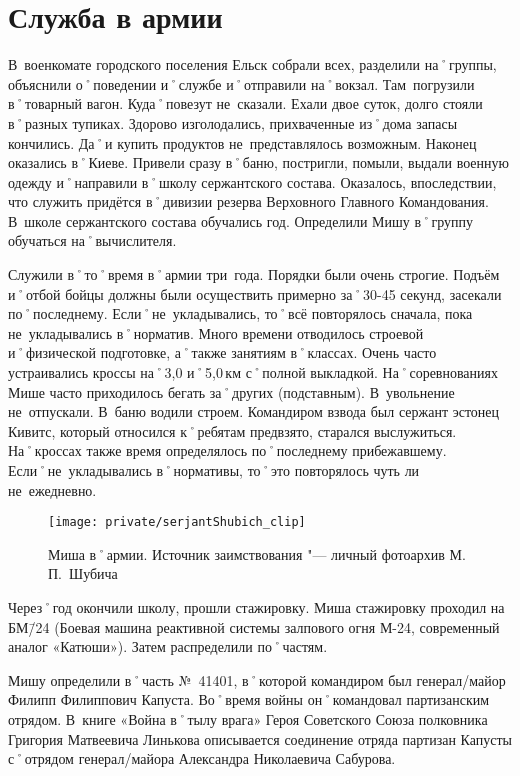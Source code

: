 ﻿\chapter{Служба в армии}
В~военкомате городского поселения Ельск собрали всех, разделили на˚группы, объяснили о˚поведении и˚службе и˚отправили на˚вокзал. Там~погрузили в˚товарный вагон. Куда˚повезут не~сказали. Ехали двое суток, долго стояли в˚разных тупиках. Здорово изголодались, прихваченные из˚дома запасы кончились. Да˚и купить продуктов не~представлялось возможным. Наконец оказались в˚Киеве. Привели сразу в˚баню, постригли, помыли, выдали военную одежду и˚направили в˚школу сержантского состава. Оказалось, впоследствии, что служить придётся в˚дивизии резерва Верховного Главного Командования. В~школе сержантского состава обучались год. Определили Мишу в˚группу обучаться на˚вычислителя.

Служили в˚то˚время в˚армии три~года. Порядки были очень строгие. Подъём и˚отбой бойцы должны были осуществить примерно за˚30-45 секунд, засекали по˚последнему. Если˚не~укладывались, то˚всё повторялось сначала, пока не~укладывались в˚норматив. Много времени отводилось строевой и˚физической подготовке, а˚также занятиям в˚классах. Очень часто устраивались кроссы на˚3,0 и˚5,0\,км с˚полной выкладкой. На˚соревнованиях Мише часто приходилось бегать за˚других (подставным). В~увольнение не~отпускали. В~баню водили строем. Командиром взвода был сержант эстонец Кивитс, который относился к˚ребятам предвзято, старался выслужиться. На˚кроссах также время определялось по˚последнему прибежавшему. Если˚не~укладывались в˚нормативы, то˚это повторялось чуть ли не~ежедневно.


\begin{figure}[H]
\texttt{[image: private/serjantShubich\_clip]}
\caption{Миша в˚армии. Источник заимствования "--- личный фотоархив М.\,П.~Шубича}
\label{fig:serjantShubich}
\end{figure}


Через˚год окончили школу, прошли стажировку. Миша стажировку проходил на БМ\=/24 (Боевая машина реактивной системы залпового огня М-24, современный аналог «Катюши»). Затем распределили по˚частям. 

Мишу определили в˚часть №~41401, в˚которой командиром был генерал\-/майор Филипп Филиппович Капуста. Во˚время войны он˚командовал партизанским отрядом. В~книге «Война в˚тылу врага» Героя Советского Союза полковника Григория Матвеевича Линькова описывается соединение отряда партизан Капусты с˚отрядом генерал\-/майора Александра Николаевича Сабурова. 

